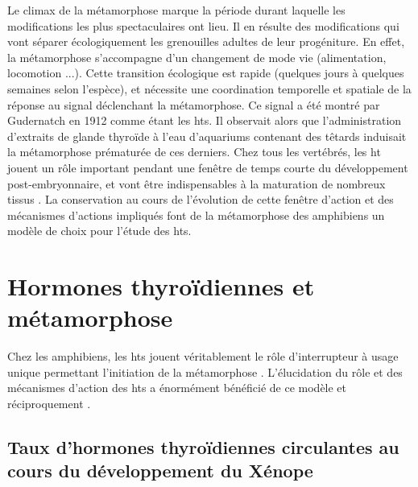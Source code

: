 \documentclass[../main.tex]{subfiles}
\begin{document}
Le climax de la métamorphose marque la période durant laquelle les modifications les plus spectaculaires ont lieu.
Il en résulte des modifications qui vont séparer écologiquement les grenouilles adultes de leur progéniture.
En effet, la métamorphose s'accompagne d'un changement de mode vie (alimentation, locomotion ...).
Cette transition écologique est rapide (quelques jours à quelques semaines selon l'espèce), et nécessite une coordination temporelle et spatiale de la réponse au signal déclenchant la métamorphose.
Ce signal a été montré par Gudernatch en 1912 comme étant les \glspl{ht}.
Il observait alors que l'administration d'extraits de glande thyroïde à l'eau d'aquariums contenant des têtards induisait la métamorphose prématurée de ces derniers.
Chez tous les vertébrés, les \gls{ht} jouent un rôle important pendant une fenêtre de temps courte du développement post-embryonnaire, et vont être indispensables à la maturation de nombreux tissus \citep{Laudet2011b}.
La conservation au cours de l'évolution de cette fenêtre d'action et des mécanismes d'actions impliqués font de la métamorphose des amphibiens un modèle de choix pour l'étude des \glspl{ht}.



\section{Hormones thyroïdiennes et métamorphose}

Chez les amphibiens, les \glspl{ht} jouent véritablement le rôle d'interrupteur à usage unique permettant l'initiation de la métamorphose \citep{Shi1998}.
L'élucidation du rôle et des mécanismes d'action des \glspl{ht} a énormément bénéficié de ce modèle et réciproquement \citep{Wong1995,Wong1998a}.


\subsection{Taux d'hormones thyroïdiennes circulantes au cours du développement du Xénope}
\end{document}
